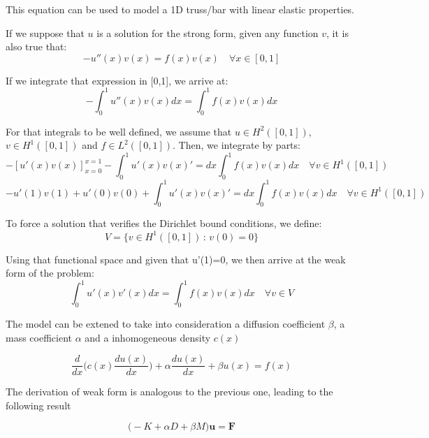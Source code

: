 \documentclass{article}
\begin{document}
\noindent This equation can be used to model a 1D truss/bar with linear elastic properties.


\noindent If we suppose that $u$ is a solution for the strong form, given any function $v$, it is also true that:
\begin{equation*}
    -u''(x)v(x) = f(x)v(x) \quad \forall x\in [0,1]
\end{equation*}

\noindent If we integrate that expression in [0,1], we arrive at:
\begin{equation*}
    -\int_0^1 u''(x)v(x)dx = \int_0^1 f(x)v(x) dx
\end{equation*}

\noindent For that integrals to be well defined, we assume that $u\in H^2([0,1])$, $v\in H^1([0,1])$ and $f\in L^2([0,1])$. Then, we integrate by parts:
\begin{equation*}
    -[u'(x)v(x)]_{x=0}^{x=1}-\int_0^1 u'(x)v(x)'=dx \int_0^1 f(x)v(x) dx \quad\forall v\in H^1([0,1])
\end{equation*}
\begin{equation*}
    -u'(1)v(1)+u'(0)v(0)+\int_0^1 u'(x)v(x)'=dx \int_0^1 f(x)v(x) dx \quad\forall v\in H^1([0,1])
\end{equation*}

\noindent To force a solution that verifies the Dirichlet bound conditions, we define:
\begin{equation*}
    V=\{ v\in H^1([0,1]) \, : \, v(0)=0\}
\end{equation*}

\noindent Using that functional space and given that u'(1)=0, we then arrive at the weak form of the problem:
\begin{equation}
    \int_0^1 u'(x)v'(x)dx= \int_0^1 f(x)v(x) dx \quad\forall v\in V
\end{equation}

The model can be extened to take into consideration a diffusion coefficient $\beta$, a mass coefficient $\alpha$ and a inhomogeneous density $c(x)$

\begin{equation}
    \frac{d}{dx}\bigg( c(x) \frac{d u(x)}{dx} \bigg) + \alpha \frac{d u(x)}{dx} + \beta u(x) = f(x)
\end{equation}

The derivation of weak form is analogous to the previous one, leading to the following result

\begin{equation}
    \big(-K + \alpha D + \beta M\big) \mathbf{u} = \mathbf{F}
\end{equation}
\end{document}
